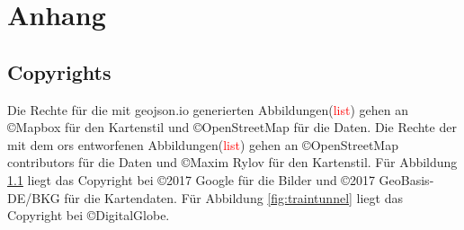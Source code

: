 \documentclass[12pt,a4paper]{article}
\newcommand\todo[1]{\textcolor{red}{#1}}
\begin{document}
\newpage
\printbibliography

\newpage
\section{Anhang}
\label{sec:anhang}
\subsection{Copyrights}
Die Rechte für die mit geojson.io generierten Abbildungen(\todo{list}) gehen an \copyright Mapbox für den Kartenstil und \copyright OpenStreetMap für die Daten.
Die Rechte der mit dem \gls{ors} entworfenen Abbildungen(\todo{list}) gehen an \copyright OpenStreetMap contributors für die Daten und \copyright Maxim Rylov für den Kartenstil.
Für Abbildung \ref{} liegt das Copyright bei \copyright 2017 Google für die Bilder und \copyright 2017 GeoBasis-DE/BKG für die Kartendaten.
Für Abbildung \ref{fig:traintunnel} liegt das Copyright bei \copyright DigitalGlobe.

%
%
%
%
%
%
%
%
%
%
%
%
\end{document}
